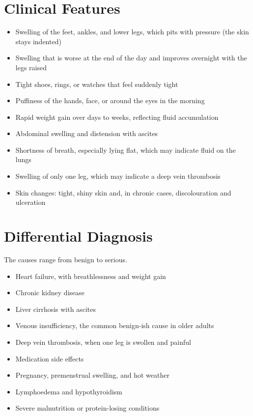 \section*{Clinical Features}
\begin{itemize}
    \item Swelling of the feet, ankles, and lower legs, which pits with pressure (the skin stays indented)
    \item Swelling that is worse at the end of the day and improves overnight with the legs raised
    \item Tight shoes, rings, or watches that feel suddenly tight
    \item Puffiness of the hands, face, or around the eyes in the morning
    \item Rapid weight gain over days to weeks, reflecting fluid accumulation
    \item Abdominal swelling and distension with ascites
    \item Shortness of breath, especially lying flat, which may indicate fluid on the lungs
    \item Swelling of only one leg, which may indicate a deep vein thrombosis
    \item Skin changes: tight, shiny skin and, in chronic cases, discolouration and ulceration
\end{itemize}

\section*{Differential Diagnosis}
The causes range from benign to serious.
\begin{itemize}
    \item Heart failure, with breathlessness and weight gain
    \item Chronic kidney disease
    \item Liver cirrhosis with ascites
    \item Venous insufficiency, the common benign-ish cause in older adults
    \item Deep vein thrombosis, when one leg is swollen and painful
    \item Medication side effects
    \item Pregnancy, premenstrual swelling, and hot weather
    \item Lymphoedema and hypothyroidism
    \item Severe malnutrition or protein-losing conditions
\end{itemize}

